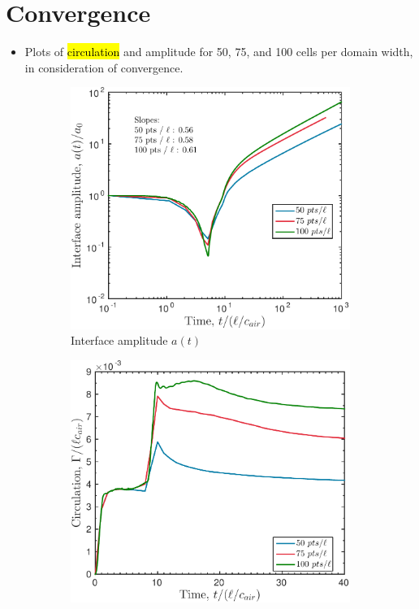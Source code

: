 \section{Convergence}
\begin{itemize}
\item Plots of \hl{circulation} and amplitude for 50, 75, and 100
  cells per domain width, in consideration of convergence.
\end{itemize}

\begin{figure}
  \begin{subfigure}{0.5\textwidth}
    \centering
    \includegraphics[width=\textwidth]{figs/appendix/amplitude_res_study}
    \caption{Interface amplitude $a(t)$}
  \end{subfigure}
  \begin{subfigure}{0.5\textwidth}
    \centering
    \includegraphics[width=\textwidth]{figs/appendix/res-study_Circulation_t1000_02-Mar-2017}

\end{subfigure}
\end{figure}
